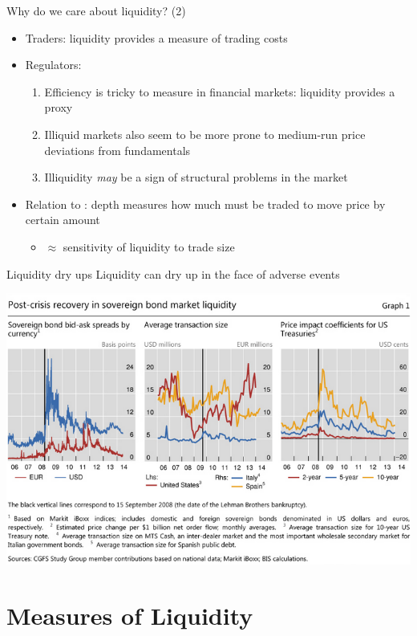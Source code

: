 \documentclass[english,10pt]{beamer}
\begin{document}
\begin{frame}{Why do we care about liquidity? (2)}
\begin{itemize}
	\item Traders: liquidity provides a measure of trading costs
	\item Regulators:
	\begin{enumerate}
		\item Efficiency is tricky to measure in financial markets: liquidity provides a proxy
		\item Illiquid markets also seem to be more prone to medium-run price deviations from fundamentals
		\item Illiquidity \textit{may} be a sign of structural problems in the market
	\end{enumerate}
	\item Relation to : depth measures how much must be traded to move price by certain amount
	\begin{itemize}
		\item $\approx$ sensitivity of liquidity to trade size
	\end{itemize}
\end{itemize}
\end{frame}


\begin{frame}{Liquidity dry ups}
	Liquidity can dry up in the face of adverse events
	\begin{center}
		\includegraphics[scale=0.5]{pics/L2_liquiditylehman}
	\end{center}
\end{frame}



\section{Measures of Liquidity}
\end{document}
